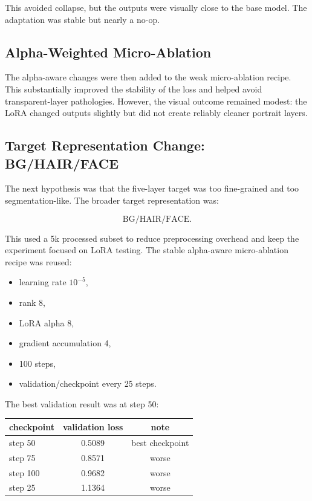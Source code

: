 \documentclass[11pt]{article}
\begin{document}
This avoided collapse, but the outputs were visually close to the base model.
The adaptation was stable but nearly a no-op.

\subsection{Alpha-Weighted Micro-Ablation}

The alpha-aware changes were then added to the weak micro-ablation recipe. This
substantially improved the stability of the loss and helped avoid transparent-layer
pathologies. However, the visual outcome remained modest: the LoRA changed outputs
slightly but did not create reliably cleaner portrait layers.

\subsection{Target Representation Change: BG/HAIR/FACE}

The next hypothesis was that the five-layer target was too fine-grained and too
segmentation-like. The broader target representation was:

\begin{equation}
\mathrm{BG}/\mathrm{HAIR}/\mathrm{FACE}.
\end{equation}

This used a 5k processed subset to reduce preprocessing overhead and keep the
experiment focused on LoRA testing. The stable alpha-aware micro-ablation recipe
was reused:

\begin{itemize}[leftmargin=*]
    \item learning rate $10^{-5}$,
    \item rank 8,
    \item LoRA alpha 8,
    \item gradient accumulation 4,
    \item 100 steps,
    \item validation/checkpoint every 25 steps.
\end{itemize}

The best validation result was at step 50:

\begin{center}
\begin{tabular}{lcc}
\toprule
checkpoint & validation loss & note \\
\midrule
step 50 & 0.5089 & best checkpoint \\
step 75 & 0.8571 & worse \\
step 100 & 0.9682 & worse \\
step 25 & 1.1364 & worse \\
\bottomrule
\end{tabular}
\end{center}
\end{document}
